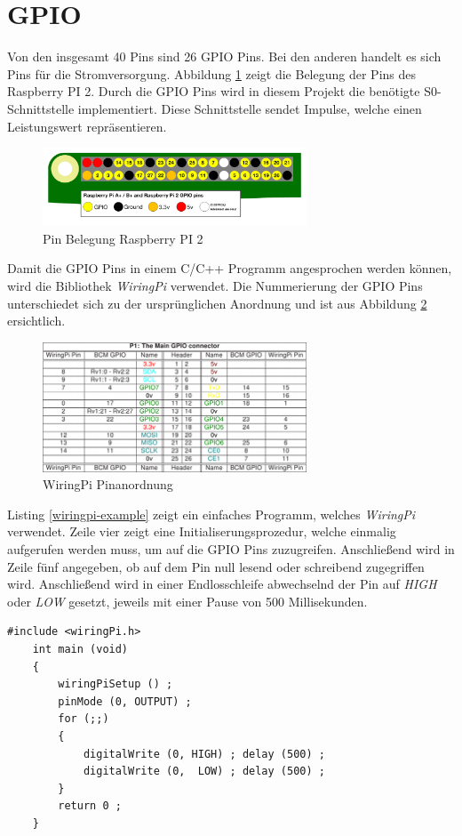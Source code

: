 \section{GPIO}
Von den insgesamt 40 Pins sind 26 GPIO Pins. Bei den anderen handelt es sich Pins für die Stromversorgung. Abbildung \ref{gpio-pins} zeigt die Belegung der Pins des Raspberry PI 2. Durch die GPIO Pins wird in diesem Projekt die benötigte S0-Schnittstelle implementiert. Diese Schnittstelle sendet Impulse, welche einen Leistungswert repräsentieren.
\begin{figure}[H]
	\centering
	\includegraphics[width=0.7\textwidth]{bilder/gpio-pins.png}
	\caption{Pin Belegung Raspberry PI 2}
	\label{gpio-pins}
\end{figure}
\noindent
Damit die GPIO Pins in einem C/C++ Programm angesprochen werden können, wird die Bibliothek \textit{WiringPi} verwendet. %
Die Nummerierung der GPIO Pins unterschiedet sich zu der ursprünglichen Anordnung und ist aus Abbildung \ref{wiringpi} ersichtlich.
 \begin{figure}[H]
 	\centering
 	\includegraphics[width=0.7\textwidth]{bilder/wiringpi.png}
 	\caption{WiringPi Pinanordnung}
 	\label{wiringpi}
 \end{figure}
\noindent
Listing \ref{wiringpi-example} zeigt ein einfaches Programm, welches \textit{WiringPi} verwendet. Zeile vier zeigt eine Initialiserungsprozedur, welche einmalig aufgerufen werden muss, um auf die GPIO Pins zuzugreifen. Anschließend wird in Zeile fünf angegeben, ob auf dem Pin null lesend oder schreibend zugegriffen wird. Anschließend wird in einer Endlosschleife abwechselnd der Pin auf \textit{HIGH} oder \textit{LOW} gesetzt, jeweils mit einer Pause von 500 Millisekunden.
\begin{lstlisting}[frame=single, basicstyle=\tiny, caption=WiringPi Beispiel, label=wiringpi-example]
	#include <wiringPi.h>
	int main (void)
	{
		wiringPiSetup () ;
		pinMode (0, OUTPUT) ;
		for (;;)
		{
			digitalWrite (0, HIGH) ; delay (500) ;
			digitalWrite (0,  LOW) ; delay (500) ;
		}
		return 0 ;
	}
\end{lstlisting}
